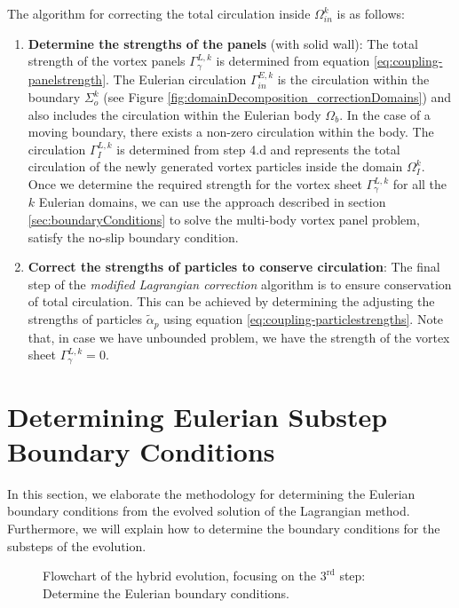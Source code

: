 	The algorithm for correcting the total circulation inside $\Omega_{in}^k$ is as follows:
	\begin{enumerate}[label=5.\alph*)]
	\item \textbf{Determine the strengths of the panels} (with solid wall): The total strength of the vortex panels $\Gamma_{\gamma}^{L,k}$ is determined from equation	\ref{eq:coupling-panelstrength}. The Eulerian circulation $\Gamma_{in}^{E,k}$ is the circulation within the boundary $\Sigma_{o}^k$ (see Figure \ref{fig:domainDecomposition_correctionDomains}) and also includes the circulation within the Eulerian body $\Omega_b$. In the case of a moving boundary, there exists a non-zero circulation within the body. The circulation $\Gamma_{I}^{L,k}$ is determined from step 4.d and represents the total circulation of the newly generated vortex particles inside the domain $\Omega_I^k$. Once we determine the required strength for the vortex sheet $\Gamma_{\gamma}^{L,k}$ for all the $k$ Eulerian domains, we can use the approach described in section \ref{sec:boundaryConditions} to solve the multi-body vortex panel problem, satisfy the no-slip boundary condition.

	\item \textbf{Correct the strengths of particles to conserve circulation}: The final step of the \textit{modified Lagrangian correction} algorithm is to ensure conservation of total circulation. This can be achieved by determining the adjusting the strengths of particles $\tilde{\alpha}_p$ using equation \ref{eq:coupling-particlestrengths}. Note that, in case we have unbounded problem, we have the strength of the vortex sheet $\Gamma_{\gamma}^{L,k} = 0$.
	\end{enumerate} 
	

\newpage
\section{Determining Eulerian Substep Boundary Conditions}	
\label{sec:coupling-desbc}

In this section, we elaborate the methodology for determining the Eulerian boundary conditions from the evolved solution of the Lagrangian method. Furthermore, we will explain how to determine the boundary conditions for the substeps of the evolution.

	\begin{figure}[H]
		\centering
		\caption{Flowchart of the hybrid evolution, focusing on the $3^{\mathrm{rd}}$ step: Determine the Eulerian boundary conditions.}
		\label{fig:flowchart_simpleCoupling_}
	\end{figure}

